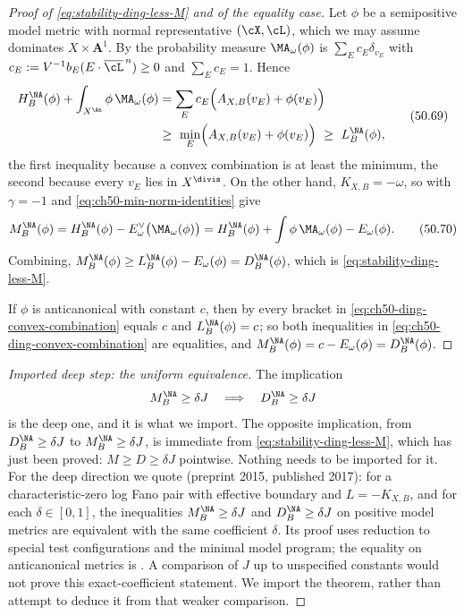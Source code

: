 \begin{proof}[Proof of \eqref{eq:stability-ding-less-M} and of the equality
case]
Let $\phi$ be a semipositive model metric with normal representative
$(\cX,\cL)$, which we may assume dominates $X\times\mathbf A^1$.  By
 the probability measure
$\MA_\omega(\phi)$ is $\sum_Ec_E\delta_{v_E}$ with
$c_E:=V^{-1}b_E(E\cdot\overline\cL^{\,n})\ge0$ and $\sum_Ec_E=1$.
Hence
\[
 \begin{split}
 H^{\NA}_B(\phi)+\int_{X^{\An}}\phi\,\MA_\omega(\phi)
 &=\sum_Ec_E\Bigl(A_{X,B}(v_E)+\phi(v_E)\Bigr)\\
 &\ge\ \min_E\Bigl(A_{X,B}(v_E)+\phi(v_E)\Bigr)
 \ \ge\ L^{\NA}_B(\phi),
 \end{split}
\tag{50.69}\label{eq:ch50-ding-convex-combination}
\]
the first inequality because a convex combination is at least the minimum,
the second because every $v_E$ lies in $X^{\divis}$.  On the other
hand, $K_{X,B}=-\omega$, so  with
$\gamma=-1$ and \eqref{eq:ch50-min-norm-identities} give
\[
 M^{\NA}_B(\phi)
 =H^{\NA}_B(\phi)-E^\vee_\omega\bigl(\MA_\omega(\phi)\bigr)
 =H^{\NA}_B(\phi)+\int\phi\,\MA_\omega(\phi)-E_\omega(\phi).
\tag{50.70}\label{eq:ch50-M-fano-form}
\]
Combining, $M^{\NA}_B(\phi)\ge L^{\NA}_B(\phi)-E_\omega(\phi)
=D^{\NA}_B(\phi)$, which is \eqref{eq:stability-ding-less-M}.

If $\phi$ is anticanonical with constant $c$, then by
 every bracket in
\eqref{eq:ch50-ding-convex-combination} equals $c$ and
$L^{\NA}_B(\phi)=c$; so both inequalities in
\eqref{eq:ch50-ding-convex-combination} are equalities, and
$M^{\NA}_B(\phi)=c-E_\omega(\phi)=D^{\NA}_B(\phi)$.
\end{proof}

\begin{proof}[Imported deep step: the uniform equivalence]
The implication
\[
 M^{\NA}_B\ge\delta J\quad\Longrightarrow\quad D^{\NA}_B\ge\delta J
\]
is the deep one, and it is what we import.  The
opposite implication, from $D^{\NA}_B\ge\delta J$ to
$M^{\NA}_B\ge\delta J$, is immediate from
\eqref{eq:stability-ding-less-M}, which has just been proved: $M\ge D\ge
\delta J$ pointwise.  Nothing needs to be imported for it.  For the deep
direction we quote \cite[Theorem~8.6]{BHJ17} (preprint 2015,
published 2017): for a characteristic-zero log Fano pair with effective
boundary and $L=-K_{X,B}$, and for each $\delta\in[0,1]$, the
inequalities $M_B^{\NA}\ge\delta J$ and $D_B^{\NA}\ge\delta J$ on
positive model metrics are equivalent with the same coefficient $\delta$.
Its proof uses reduction to special test configurations and the minimal
model program; the equality on anticanonical metrics is
\cite[Proposition~7.32]{BHJ17}.  A comparison of $J$ up to unspecified
constants would not prove this exact-coefficient statement.  We import
the theorem, rather than attempt to deduce it from that weaker comparison.
\end{proof}

